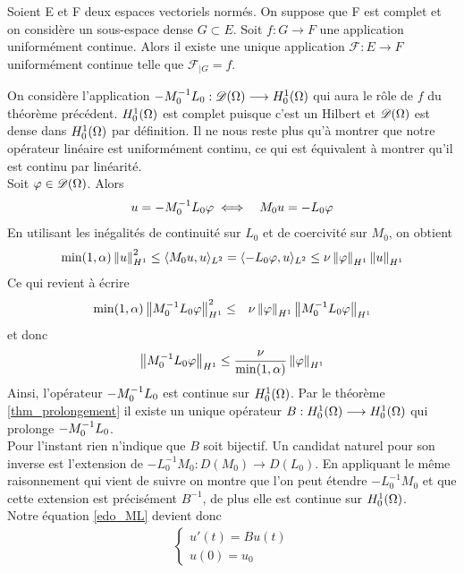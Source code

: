 \begin{theoreme}\label{thm_prolongement}
    Soient E et F deux espaces vectoriels normés. On suppose que F est complet et on considère un sous-espace dense $G \subset E$. Soit $f : G \longrightarrow F$ une application uniformément continue. Alors il existe une unique application $\mathscr{F} : E \longrightarrow F$ uniformément continue telle que $\mathscr{F}_{|G} = f$.
\end{theoreme}

On considère l'application $-M^{-1}_0L_0 : \mathscr{D}(\Omega)\longrightarrow H^1_0(\Omega)$ qui aura le rôle de $f$ du théorème précédent. $H^1_0(\Omega)$ est complet puisque c'est un Hilbert et $\mathscr{D}(\Omega)$ est dense dans $H^1_0(\Omega)$ par définition. Il ne nous reste plus qu'à montrer que notre opérateur linéaire est uniformément continu, ce qui est équivalent à montrer qu'il est continu par linéarité.
\\
Soit $\varphi \in \mathscr{D}(\Omega)$. Alors 
\begin{eqnarray*}
    u = -M^{-1}_0 L_0 \varphi &\iff& M_0u = -L_0 \varphi
\end{eqnarray*}
En utilisant les inégalités de continuité sur $L_0$ et de coercivité sur $M_0$, on obtient
\begin{eqnarray*}
    \min(1,\alpha) \left\lVert u \right\rVert^2_{H^1} \leq \langle M_0u, u \rangle_{L^2} = \langle -L_0\varphi, u \rangle_{L^2} \leq \nu \left\lVert \varphi \right\rVert_{H^1}\left\lVert u \right\rVert_{H^1}
\end{eqnarray*}
Ce qui revient à écrire 
\begin{eqnarray*}
    \min(1,\alpha) \left\lVert M^{-1}_0 L_0 \varphi \right\rVert^2_{H^1} &\leq& \nu \left\lVert \varphi \right\rVert_{H^1}\left\lVert M^{-1}_0 L_0 \varphi \right\rVert_{H^1}
\end{eqnarray*}
et donc 
\begin{eqnarray*}
    \left\lVert M^{-1}_0 L_0 \varphi \right\rVert_{H^1} \leq \frac{\nu}{\min(1,\alpha)}\left\lVert \varphi \right\rVert_{H^1}
\end{eqnarray*}
Ainsi, l'opérateur $-M^{-1}_0 L_0$ est continue sur $H^1_0(\Omega)$. Par le théorème \eqref{thm_prolongement} il existe un unique opérateur $B : H^1_0(\Omega) \longrightarrow H^1_0(\Omega)$ qui prolonge $-M^{-1}_0 L_0$.
\\
Pour l'instant rien n'indique que $B$ soit bijectif. Un candidat naturel pour son inverse est l'extension de $-L^{-1}_0M_0 : D(M_0) \longrightarrow D(L_0)$. En appliquant le même raisonnement qui vient de suivre on montre que l'on peut étendre $-L^{-1}_0M_0$ et que cette extension est précisément $B^{-1}$, de plus elle est continue sur $H^1_0(\Omega)$. 
\\
Notre équation \eqref{edo_ML} devient donc
\begin{eqnarray}\label{edo_ML_B}
\begin{cases}
    u'(t) = Bu(t)  \\
    u(0) = u_0
\end{cases}
\end{eqnarray}

